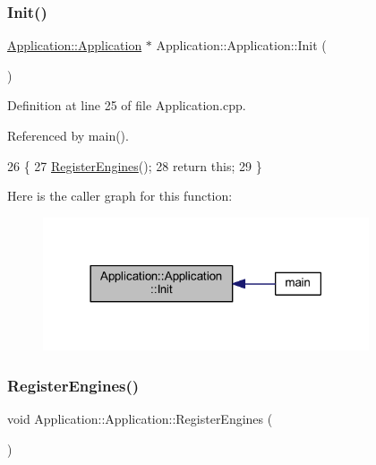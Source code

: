 \subsubsection{\texorpdfstring{Init()}{Init()}}
{\footnotesize\ttfamily \mbox{\hyperlink{classApplication_1_1Application}{Application\+::\+Application}} $\ast$ Application\+::\+Application\+::\+Init (\begin{DoxyParamCaption}{ }\end{DoxyParamCaption})}



Definition at line 25 of file Application.\+cpp.



Referenced by main().


\begin{DoxyCode}
26 \{
27     \mbox{\hyperlink{classApplication_1_1Application_a877f88238e07698fb9fcc0b71e9f15e7}{RegisterEngines}}();
28     \textcolor{keywordflow}{return} \textcolor{keyword}{this};
29 \}
\end{DoxyCode}
Here is the caller graph for this function\+:
\nopagebreak
\begin{figure}[H]
\begin{center}
\leavevmode
\includegraphics[width=273pt]{classApplication_1_1Application_a478f6946c4bf5361281681f2b58385c3_icgraph}
\end{center}
\end{figure}
\mbox{\label{classApplication_1_1Application_a877f88238e07698fb9fcc0b71e9f15e7}} 
\subsubsection{\texorpdfstring{Register\+Engines()}{RegisterEngines()}}
{\footnotesize\ttfamily void Application\+::\+Application\+::\+Register\+Engines (\begin{DoxyParamCaption}{ }\end{DoxyParamCaption})\hspace{0.3cm}{\ttfamily [private]}}



